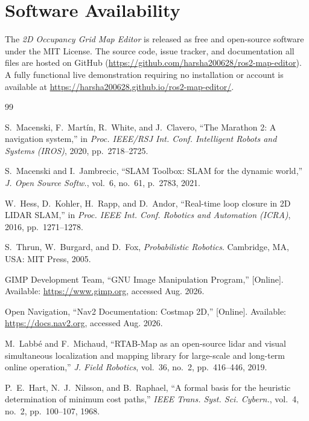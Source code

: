 \documentclass{IEEE_lsens}
\begin{document}
\section*{Software Availability}
The \emph{2D Occupancy Grid Map Editor} is released as free and open-source software under the MIT License. The source code, issue tracker, and documentation all files are hosted on GitHub       (\url{https://github.com/harsha200628/ros2-map-editor}). A fully functional live demonstration requiring no installation or account is available at \url{https://harsha200628.github.io/ros2-map-editor/}.

\begin{thebibliography}{99}
\footnotesize
\setlength{\itemsep}{0pt}
\setlength{\parskip}{0pt}

S.~Macenski, F.~Martín, R.~White, and J.~Clavero, ``The Marathon 2: A navigation system,'' in \emph{Proc. IEEE/RSJ Int. Conf. Intelligent Robots and Systems (IROS)}, 2020, pp.\ 2718--2725.

S.~Macenski and I.~Jambrecic, ``SLAM Toolbox: SLAM for the dynamic world,'' \emph{J. Open Source Softw.}, vol.~6, no.~61, p.~2783, 2021.

W.~Hess, D.~Kohler, H.~Rapp, and D.~Andor, ``Real-time loop closure in 2D LIDAR SLAM,'' in \emph{Proc. IEEE Int. Conf. Robotics and Automation (ICRA)}, 2016, pp.\ 1271--1278.

S.~Thrun, W.~Burgard, and D.~Fox, \emph{Probabilistic Robotics}. Cambridge, MA, USA: MIT Press, 2005.

GIMP Development Team, ``GNU Image Manipulation Program,'' [Online]. Available: \url{https://www.gimp.org}, accessed Aug. 2026.

Open Navigation, ``Nav2 Documentation: Costmap 2D,'' [Online]. Available: \url{https://docs.nav2.org}, accessed Aug. 2026.

M.~Labbé and F.~Michaud, ``RTAB-Map as an open-source lidar and visual simultaneous localization and mapping library for large-scale and long-term online operation,'' \emph{J. Field Robotics}, vol.~36, no.~2, pp.\ 416--446, 2019.

P.~E.~Hart, N.~J.~Nilsson, and B.~Raphael, ``A formal basis for the heuristic determination of minimum cost paths,'' \emph{IEEE Trans. Syst. Sci. Cybern.}, vol.~4, no.~2, pp.\ 100--107, 1968.


\end{thebibliography}
\end{document}
